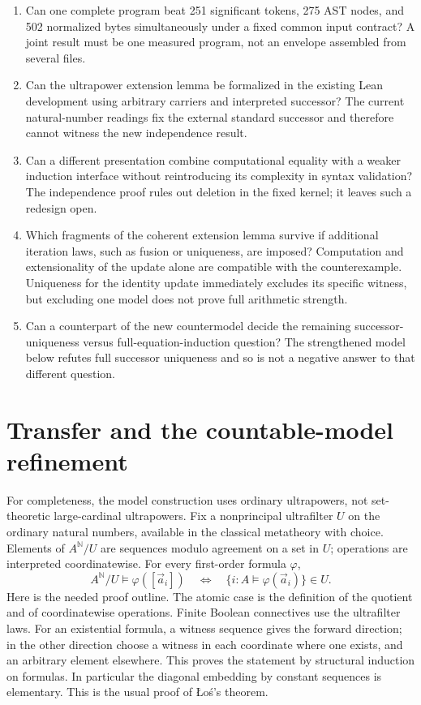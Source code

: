 \documentclass[11pt,letterpaper]{article}
\theoremstyle{definition}
\begin{document}
\begin{enumerate}
\item Can one complete program beat 251 significant tokens, 275 AST nodes,
and 502 normalized bytes simultaneously under a fixed common input
contract? A joint result must be one measured program, not an envelope
assembled from several files.
\item Can the ultrapower extension lemma be formalized in the existing Lean
development using arbitrary carriers and interpreted successor? The current
natural-number readings fix the external standard successor and therefore
cannot witness the new independence result.
\item Can a different presentation combine computational equality with a
weaker induction interface without reintroducing its complexity in syntax
validation? The independence proof rules out deletion in the fixed kernel;
it leaves such a redesign open.
\item Which fragments of the coherent extension lemma survive if additional
iteration laws, such as fusion or uniqueness, are imposed? Computation and
extensionality of the update alone are compatible with the counterexample.
Uniqueness for the identity update immediately excludes its specific
witness, but excluding one model does not prove full arithmetic strength.
\item Can a counterpart of the new countermodel decide the remaining
successor-uniqueness versus full-equation-induction question? The strengthened
model below refutes full successor uniqueness and so is not a negative
answer to that different question.
\end{enumerate}

\appendix
\section{Transfer and the countable-model refinement}
\label{app:transfer}

For completeness, the model construction uses ordinary ultrapowers, not
set-theoretic large-cardinal ultrapowers. Fix a nonprincipal ultrafilter
$U$ on the ordinary natural numbers, available in the classical metatheory
with choice. Elements of $A^{\mathbb N}/U$ are sequences modulo agreement
on a set in $U$; operations are interpreted coordinatewise. For every
first-order formula $\varphi$,
\[
A^{\mathbb N}/U\models\varphi([\vec a_i])
\quad\Longleftrightarrow\quad
\{i:A\models\varphi(\vec a_i)\}\in U.
\]
Here is the needed proof outline. The atomic case is the definition of
the quotient and of coordinatewise operations. Finite Boolean connectives
use the ultrafilter laws. For an existential formula, a witness sequence
gives the forward direction; in the other direction choose a witness in
each coordinate where one exists, and an arbitrary element elsewhere.
This proves the statement by structural induction on formulas. In
particular the diagonal embedding by constant sequences is elementary.
This is the usual proof of \L o\'s's theorem.
\end{document}
